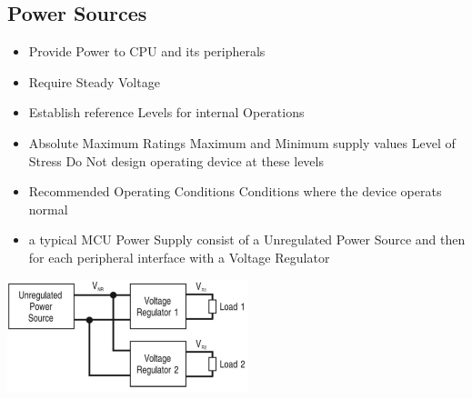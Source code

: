 \subsection{Power Sources }
\begin{minipage}{13cm}
\begin{itemize}
	\item Provide Power to \acs{CPU} and its peripherals
	\item Require Steady Voltage
	\item Establish reference Levels for internal Operations
	\item Absolute Maximum Ratings
	\subitem Maximum and Minimum supply values
	\subitem Level of Stress
	\subitem Do Not design operating device at these levels
	\item Recommended Operating Conditions
	\subitem Conditions where the device operats normal
	\item a typical \acs{MCU} Power Supply consist of a Unregulated Power Source and then for each peripheral interface with a Voltage Regulator
\end{itemize}
\end{minipage}
\begin{minipage}{5cm}
    \hspace*{-2cm}
    \includegraphics[width=7cm]{images/PowerSource.png}
\end{minipage}

